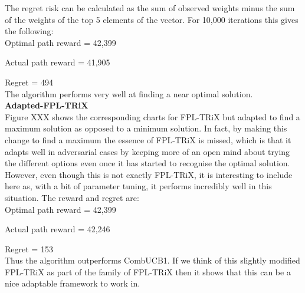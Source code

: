 The regret risk can be calculated as the sum of observed weights minus the sum of the weights of the top 5 elements of the vector. For 10,000 iterations this gives the following:\\

Optimal path reward = 42,399

Actual path reward = 41,905

Regret = 494\\

The algorithm performs very well at finding a near optimal solution.\\

\noindent \textbf{Adapted-FPL-TRiX}\\

Figure XXX shows the corresponding charts for FPL-TRiX but adapted to find a maximum solution as opposed to a minimum solution. In fact, by making this change to find a maximum the essence of FPL-TRiX is missed, which is that it adapts well in adversarial cases by keeping more of an open mind about trying the different options even once it has started to recognise the optimal solution. However, even though this is not exactly FPL-TRiX, it is interesting to include here as, with a bit of parameter tuning, it performs incredibly well in this situation. The reward and regret are:\\

Optimal path reward = 42,399

Actual path reward = 42,246

Regret = 153\\

Thus the algorithm outperforms CombUCB1. If we think of this slightly modified FPL-TRiX as part of the family of FPL-TRiX then it shows that this can be a nice adaptable framework to work in.\\

